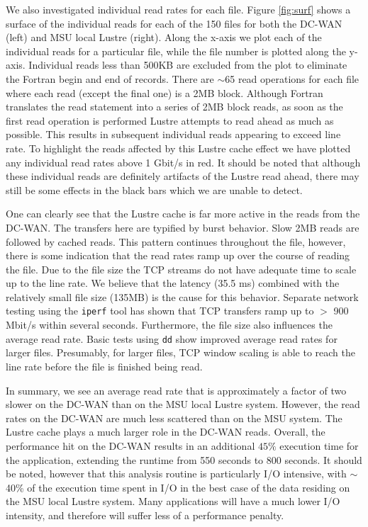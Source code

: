 \documentclass[]{sig-alternate}
\begin{document}
We also investigated individual read rates for each file. Figure \ref{fig:surf} shows a surface of the individual reads for each of the 150 files for both the DC-WAN (left) and MSU local Lustre (right). Along the x-axis we plot each of the individual reads for a particular file, while the file number is plotted along the y-axis. Individual reads less than 500KB are excluded from the plot to eliminate the Fortran begin and end of records. There are $\sim$65 read operations for each file where each read (except the final one) is a 2MB block. Although Fortran translates the read statement into a series of 2MB block reads, as soon as the first read operation is performed Lustre attempts to read ahead as much as possible. This results in subsequent individual reads appearing to exceed line rate. To highlight the reads affected by this Lustre cache effect we have plotted any individual read rates above 1 Gbit/s in red. It should be noted that although these individual reads are definitely artifacts of the Lustre read ahead, there may still be some effects in the black bars which we are unable to detect.

One can clearly see that the Lustre cache is far more active in the reads from the DC-WAN. The transfers here are typified by burst behavior. Slow 2MB reads are followed by cached reads. This pattern continues throughout the file, however, there is some indication that the read rates ramp up over the course of reading the file. Due to the file size the TCP streams do not have adequate time to scale up to the line rate. We believe that the latency (35.5 ms) combined with the relatively small file size (135MB) is the cause for this behavior. Separate network testing using the {\tt iperf} tool has shown that TCP transfers ramp up to $>$ 900 Mbit/s within several seconds. Furthermore, the file size also influences the average read rate. Basic tests using {\tt dd} show improved average read rates for larger files. Presumably, for larger files, TCP window scaling is able to reach the line rate before the file is finished being read. 

In summary, we see an average read rate that is approximately a factor of two slower on the DC-WAN than on the MSU local Lustre system. However, the read rates on the DC-WAN are much less scattered than on the MSU system. The Lustre cache plays a much larger role in the DC-WAN reads. Overall, the performance hit on the DC-WAN results in an additional $45\%$ execution time for the application, extending the runtime from 550 seconds to 800 seconds. It should be noted, however that this analysis routine is particularly I/O intensive, with $\sim$40\% of the execution time spent in I/O in the best case of the data residing on the MSU local Lustre system. Many applications will have a much lower I/O intensity, and therefore will suffer less of a performance penalty. 
\end{document}
